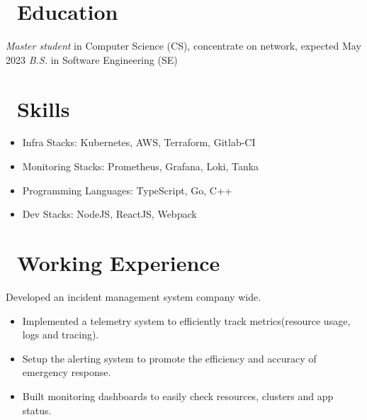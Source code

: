 \documentclass{resume}
\begin{document}



\section{\faGraduationCap\ Education}
\textit{Master student} in Computer Science (CS), concentrate on network, expected May 2023
\textit{B.S.} in Software Engineering (SE)

\section{\faCogs\ Skills}
\begin{itemize}[parsep=0.5ex]
  \item Infra Stacks: Kubernetes, AWS, Terraform, Gitlab-CI
  \item Monitoring Stacks: Prometheus, Grafana, Loki, Tanka
  \item Programming Languages: TypeScript, Go, C++
  \item Dev Stacks: NodeJS, ReactJS, Webpack
\end{itemize}

\section{\faUsers\ Working Experience}
Developed an incident management system company wide.
\begin{itemize}
  \item Implemented a telemetry system to efficiently track metrics(resource usage, logs and tracing).
  \item Setup the alerting system to promote the efficiency and accuracy of emergency response.
  \item Built monitoring dashboards to easily check resources, clusters and app status.
\end{itemize}
\end{document}
